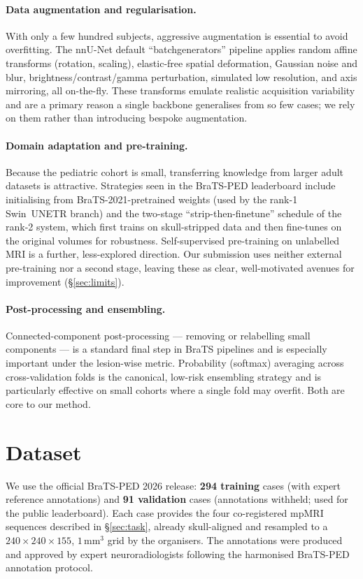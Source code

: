 \documentclass[11pt,a4paper]{article}
\begin{document}
\paragraph{Data augmentation and regularisation.}
With only a few hundred subjects, aggressive augmentation is essential to avoid
overfitting. The nnU-Net default ``batchgenerators'' pipeline applies random affine
transforms (rotation, scaling), elastic-free spatial deformation, Gaussian noise and
blur, brightness/contrast/gamma perturbation, simulated low resolution, and axis
mirroring, all on-the-fly. These transforms emulate realistic acquisition variability
and are a primary reason a single backbone generalises from so few cases; we rely on
them rather than introducing bespoke augmentation.

\paragraph{Domain adaptation and pre-training.}
Because the pediatric cohort is small, transferring knowledge from larger adult
datasets is attractive. Strategies seen in the BraTS-PED leaderboard include
initialising from BraTS-2021-pretrained weights (used by the rank-1 Swin~UNETR branch)
and the two-stage ``strip-then-finetune'' schedule of the rank-2 system, which first
trains on skull-stripped data and then fine-tunes on the original volumes for
robustness. Self-supervised pre-training on unlabelled MRI is a further, less-explored
direction. Our submission uses neither external pre-training nor a second stage,
leaving these as clear, well-motivated avenues for improvement (\S\ref{sec:limits}).

\paragraph{Post-processing and ensembling.}
Connected-component post-processing --- removing or relabelling small components ---
is a standard final step in BraTS pipelines and is especially important under the
lesion-wise metric. Probability (softmax) averaging across cross-validation folds is
the canonical, low-risk ensembling strategy and is particularly effective on small
cohorts where a single fold may overfit. Both are core to our method.

\section{Dataset}
\label{sec:data}
We use the official BraTS-PED 2026 release: \textbf{294 training} cases (with expert
reference annotations) and \textbf{91 validation} cases (annotations withheld; used
for the public leaderboard). Each case provides the four co-registered mpMRI
sequences described in \S\ref{sec:task}, already skull-aligned and resampled to a
$240\times240\times155$, $1\,\text{mm}^3$ grid by the organisers. The annotations
were produced and approved by expert neuroradiologists following the harmonised
BraTS-PED annotation protocol.
\end{document}
